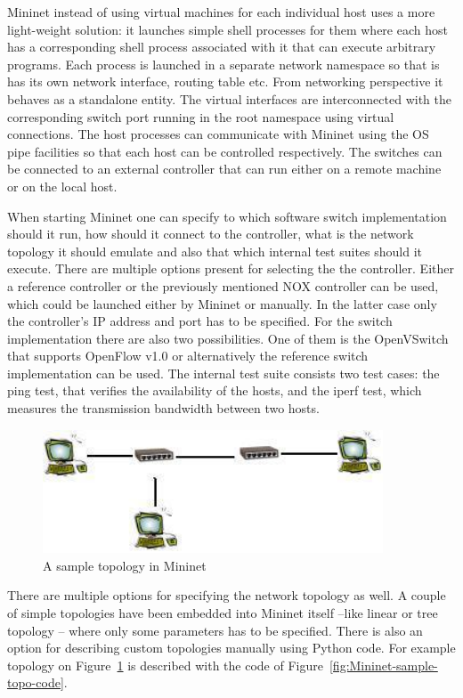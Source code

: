 \documentclass{article}
\begin{document}
Mininet instead of using virtual machines for each individual host uses a more light-weight solution: it launches
simple shell processes for them where each host has a corresponding shell process associated with it that can execute
arbitrary programs. Each process is launched in a separate network namespace so that is has its own network interface,
routing table etc. From networking perspective it behaves as a standalone entity. The virtual interfaces are
interconnected with the corresponding switch port running in the root namespace using virtual connections. The host
processes can communicate with Mininet using the OS pipe facilities so that each host can be controlled respectively.
The switches can be connected to an external controller that can run either on a remote machine or on the local host.

When starting Mininet one can specify to which software switch implementation should it run, how should it connect to
the controller, what is the network topology it should emulate and also that which internal test suites should it
execute.
There are multiple options present for selecting the the controller. Either a reference controller or the previously
mentioned NOX controller can be used, which could be launched either by Mininet or manually. In the latter case only
the controller's IP address and port has to be specified. For the switch implementation there are also two
possibilities. One of them is the OpenVSwitch that supports OpenFlow v1.0 or alternatively the reference switch
implementation can be used. The internal test suite consists two test cases: the ping test, that verifies the
availability of the hosts, and the iperf test, which measures the transmission bandwidth between two hosts.

\begin{figure}[H]%
    \centering
    \includegraphics[width=0.9\textwidth]{figures/mininet-topology.jpg}
    \caption{A sample topology in Mininet}
    \label{fig:Mininet-sample-topo}
\end{figure}

There are multiple options for specifying the network topology as well. A couple of simple topologies have been
embedded into Mininet itself --like linear or tree topology -- where only some parameters has to be specified.
There is also an option for describing custom topologies manually using Python code. For example topology on
Figure~\ref{fig:Mininet-sample-topo} is described with the code of Figure~\ref{fig:Mininet-sample-topo-code}.
\end{document}
